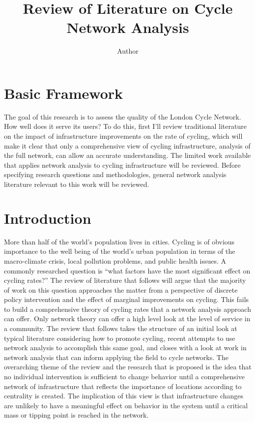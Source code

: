\documentclass[11pt]{article} %
\title{\vspace{-3.0cm}Review of Literature on Cycle Network Analysis}
\author{Author}
\begin{document}
\maketitle

\section{Basic Framework}

The goal of this research is to assess the quality of the London Cycle Network. How well does it serve its users? To do this, first I'll review traditional literature on the impact of infrastructure improvements on the rate of cycling, which will make it clear that only a comprehensive view of cycling infrastructure, analysis of the full network, can allow an accurate understanding. The limited work available that applies network analysis to cycling infrastructure will be reviewed. Before specifying research questions and methodologies, general network analysis literature relevant to this work will be reviewed. 


\section{Introduction}

More than half of the world's population lives in cities. Cycling is of obvious importance to the well being of the world's  urban population in terms of the macro-climate crisis, local pollution problems, and public health issues. A commonly researched question is ``what factors have the most significant effect on cycling rates?'' The review of literature that follows will argue that the majority of work on this question approaches the matter from a perspective of discrete policy intervention and the effect of marginal improvements on cycling. This fails to build a comprehensive theory of cycling rates that a network analysis approach can offer. Only network theory can offer a high level look at the level of service in a community. The review that follows takes the structure of an initial look at typical literature considering how to promote cycling, recent attempts to use network analysis to accomplish this same goal, and closes with a look at work in network analysis that can inform applying the field to cycle networks. The overarching theme of the review and the research that is proposed is the idea that no individual intervention is sufficient to change behavior until a comprehensive network of infrastructure that reflects the importance of locations according to centrality is created. The implication of this view is that infrastructure changes are unlikely to have a meaningful effect on behavior in the system until a critical mass or tipping point is reached in the network. 
\end{document}
